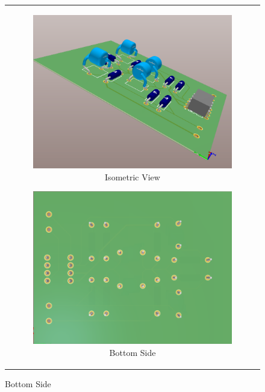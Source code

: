 \documentclass[hidelinks,12pt]{article}
\begin{document}
\begin{figure}[!h]
\begin{tabular}{c}
				\begin{subfigure}[h]{0.5\textwidth}
					\centering
					\includegraphics[width=\textwidth]{figures/altium/isometric_view}
					\caption{Isometric View}
				\end{subfigure}
				\hfill
				\begin{subfigure}[h]{0.5\textwidth}
					\centering
					\includegraphics[width=\textwidth]{figures/altium/bottom_side}
					\caption{Bottom Side}
				\end{subfigure}
			\end{tabular}
	\end{figure}
	
	
	\pagebreak
	
\end{document}
